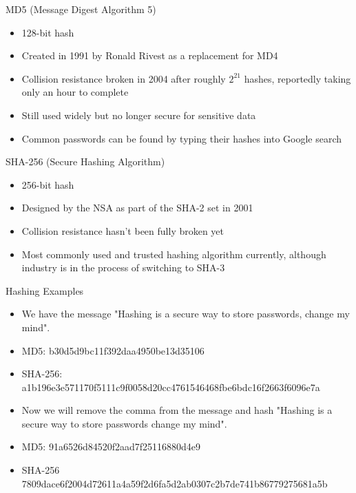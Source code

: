 \documentclass{article}
\begin{document}
{MD5 (Message Digest Algorithm 5)}
	\begin{itemize}
		\item 128-bit hash
		\item Created in 1991 by Ronald Rivest as a replacement for MD4
		\item Collision resistance broken in 2004 after roughly $2^{21}$ hashes, reportedly taking only an hour to complete
		\item Still used widely but no longer secure for sensitive data
		\item Common passwords can be found by typing their hashes into Google search\newline
	\end{itemize}

{SHA-256 (Secure Hashing Algorithm)}
	\begin{itemize}
		\item 256-bit hash
		\item Designed by the NSA as part of the SHA-2 set in 2001
		\item Collision resistance hasn't been fully broken yet
		\item Most commonly used and trusted hashing algorithm currently, although industry is in the process of switching to SHA-3\newline
	\end{itemize}

{Hashing Examples}
	\begin{itemize}
		\item We have the message "Hashing is a secure way to store passwords, change my mind".
		\item MD5: b30d5d9bc11f392daa4950be13d35106
		\item SHA-256: a1b196e3e571170f5111c9f0058d20cc4761546468fbe6bdc16f2663f6096e7a
		\item Now we will remove the comma from the message and hash "Hashing is a secure way to store passwords change my mind".
		\item MD5: 91a6526d84520f2aad7f25116880d4e9
		\item SHA-256 7809dace6f2004d72611a4a59f2d6fa5d2ab0307c2b7de741b86779275681a5b\newline
	\end{itemize}
\end{document}
